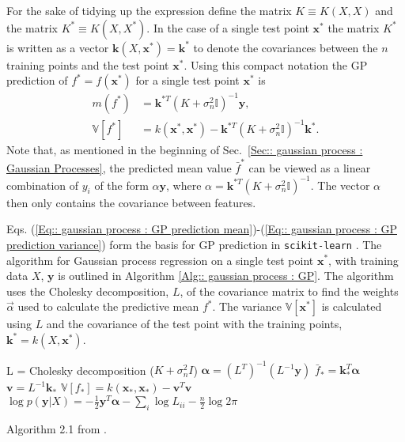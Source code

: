 \documentclass[twoside,english]{uiofysmaster}
\begin{document}
For the sake of tidying up the expression define the matrix $K \equiv K(X, X)$ and the matrix $K^* \equiv K(X, X^*)$. In the case of a single test point $\textbf{x}^*$ the matrix $K^*$ is written as a vector $\textbf{k}(X, \textbf{x}^*) = \textbf{k}^*$ to denote the covariances between the $n$ training points and the test point $\textbf{x}^*$. Using this compact notation the GP prediction of $f^*=f(\textbf{x}^*)$ for a single test point $\textbf{x}^*$ is
\begin{align}
m(f^*) &= \textbf{k}^{*T}(K + \sigma_n^2\mathbb{I})^{-1} \textbf{y},\label{Eq:: gaussian process : GP prediction mean}\\
\mathbb{V}[f^*] &= k(\textbf{x}^*, \textbf{x}^*) - \textbf{k}^{*T}(K + \sigma_n^2 \mathbb{I})^{-1} \textbf{k}^*\label{Eq:: gaussian process : GP prediction variance}.
\end{align}
Note that, as mentioned in the beginning of Sec.~\ref{Sec:: gaussian process : Gaussian Processes}, the predicted mean value $\bar{f}^*$ can be viewed as a linear combination of $y_i$ of the form $\alpha \textbf{y}$, where $\alpha = \textbf{k}^{*T}(K + \sigma_n^2\mathbb{I})^{-1}$. The vector $\alpha$ then only contains the covariance between features.

Eqs. (\ref{Eq:: gaussian process : GP prediction mean})-(\ref{Eq:: gaussian process : GP prediction variance}) form the basis for GP prediction in \verb|scikit-learn|  \cite{scikit-learn}. The algorithm for Gaussian process regression on a single test point $\textbf{x}^*$, with training data $X$, $\textbf{y}$ is outlined in Algorithm \ref{Alg:: gaussian process : GP}. The algorithm uses the Cholesky decomposition, $L$, of the covariance matrix to find the weights $\vec{\alpha}$ used to calculate the predictive mean $f^*$. The variance $\mathbb{V}[\textbf{x}^*]$ is calculated using $L$ and the covariance of the test point with the training points, $\textbf{k}^* = k(X, \textbf{x}^*)$.

\begin{algorithm}
L = Cholesky decomposition ($K + \sigma_n^2 I$) \;
$\boldsymbol{\alpha} = (L^T)^{-1}(L^{-1} \textbf{y})$ \;
$\bar{f}_* = \textbf{k}_*^T \boldsymbol{\alpha}$ \;
$\textbf{v} = L^{-1} \textbf{k}_*$ \;
$\mathbb{V}[f_*] = k(\textbf{x}_*, \textbf{x}_*) - \textbf{v}^T \textbf{v}$ \;
$\log p(\textbf{y}|X) = - \frac{1}{2} \textbf{y}^T \boldsymbol{\alpha} - \sum_i \log L_{ii} - \frac{n}{2} \log 2 \pi$ \;
\caption{Algorithm 2.1 from \cite{rasmussen2006gaussian}.}
\label{Alg:: gaussian process : GP}
\end{algorithm}
\end{document}
